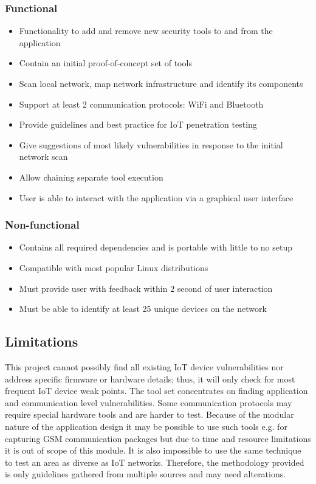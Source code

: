     \subsubsection{Functional}
        \begin{itemize}
            \item Functionality to add and remove new security tools to and from the application
            \item Contain an initial proof-of-concept set of tools
            \item Scan local network, map network infrastructure and identify its components
            \item Support at least 2 communication protocols: WiFi and Bluetooth
            \item Provide guidelines and best practice for IoT penetration testing
            \item Give suggestions of most likely vulnerabilities in response to the initial network scan
            \item Allow chaining separate tool execution
            \item User is able to interact with the application via a graphical user interface
        \end{itemize}
    
    \subsubsection{Non-functional}
        \begin{itemize}
            \item Contains all required dependencies and is portable with little to no setup
            \item Compatible with most popular Linux distributions
            \item Must provide user with feedback within 2 second of user interaction
            \item Must be able to identify at least 25 unique devices on the network
        \end{itemize}

\subsection{Limitations}
This project cannot possibly find all existing IoT device vulnerabilities nor address specific firmware or hardware details; thus, it will only check for most frequent IoT device weak points. The tool set concentrates on finding application and communication level vulnerabilities. Some communication protocols may require special hardware tools and are harder to test. Because of the modular nature of the application design it may be possible to use such tools e.g. for capturing GSM communication packages \cite{DBLP:journals/corr/ShaikBANS15} but due to time and resource limitations it is out of scope of this module. It is also impossible to use the same technique to test an area as diverse as IoT networks. Therefore, the methodology provided is only guidelines gathered from multiple sources and may need alterations.

